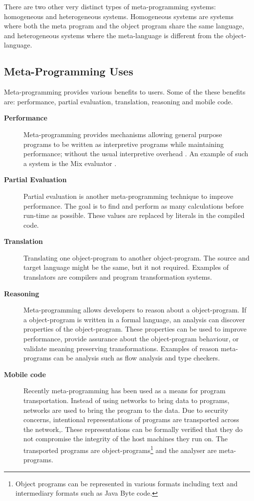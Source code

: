 There are two other very distinct types of meta-programming systems: homogeneous and heterogeneous systems. 
Homogeneous systems are systems where both the meta program and the object program share the same language, and heterogeneous systems where the meta-language is different from the object-language\cite{sheard2001accomplishments}.

\subsection{Meta-Programming Uses}
Meta-programming provides various benefits to users. Some of the these benefits are: performance, partial evaluation, translation, reasoning and mobile code.

\begin{description}
    \item[\textbf{Performance}]
    Meta-programming provides mechanisms allowing general purpose programs to be written as interpretive programs while maintaining performance; without the usual interpretive overhead \cite{sheard2001accomplishments}. An example of such a system is the Mix evaluator \cite{jones1989mix}.

    \item[\textbf{Partial Evaluation}] 
    Partial evaluation is another meta-programming technique to improve performance. The goal is to find and perform as many calculations before run-time as possible. These values are replaced by literals in the compiled code.

    \item[\textbf{Translation}]
    Translating one object-program to another object-program. The source and target language might be the same, but it not required. Examples of translators are compilers and program transformation systems\cite{sheard2001accomplishments}.

    \item[\textbf{Reasoning}]
    Meta-programming allows developers to reason about a object-program. If a object-program is written in a formal language, an analysis can discover properties of the object-program. These properties can be used to improve performance, provide assurance about the object-program behaviour, or validate meaning preserving transformations. Examples of reason meta-programs can be analysis such as flow analysis and type checkers.

    \item[\textbf{Mobile code}]
    Recently meta-programming has been used as a means for program transportation. Instead of using networks to bring data to programs, networks are used to bring the program to the data. Due to security concerns, intentional representations of programs are transported across the network\cite{Hornof:1999:CCR:609149.609203},\cite{Thibault:1998:SEA:829523.830979}. These representations can be formally verified that they do not compromise the integrity of the host machines they run on. The transported programs are object-programs\footnote{Object programs can be represented in various formats including text and intermediary formats such as Java Byte code.} and the analyser are meta-programs.
\end{description}

